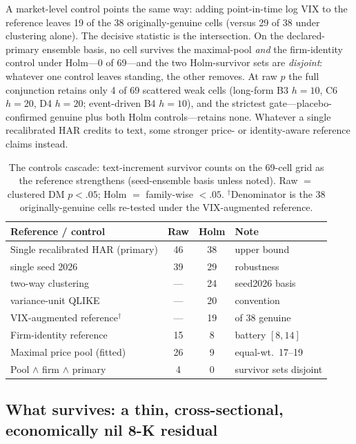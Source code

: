 A market-level control points the same way: adding point-in-time log VIX to the reference leaves 19 of the 38 originally-genuine cells (versus 29 of 38 under clustering alone). The decisive statistic is the intersection. On the declared-primary ensemble basis, no cell survives the maximal-pool \emph{and} the firm-identity control under Holm---0 of 69---and the two Holm-survivor sets are \emph{disjoint}: whatever one control leaves standing, the other removes. At raw $p$ the full conjunction retains only 4 of 69 scattered weak cells (long-form B3 $h{=}10$, C6 $h{=}20$, D4 $h{=}20$; event-driven B4 $h{=}10$), and the strictest gate---placebo-confirmed genuine plus both Holm controls---retains none. Whatever a single recalibrated HAR credits to text, some stronger price- or identity-aware reference claims instead.

\begin{table}[t]
\centering
\caption{The controls cascade: text-increment survivor counts on the 69-cell grid as the reference strengthens (seed-ensemble basis unless noted). Raw $=$ clustered DM $p<.05$; Holm $=$ family-wise $<.05$. $^{\dagger}$Denominator is the 38 originally-genuine cells re-tested under the VIX-augmented reference.}
\label{tab:cascade}
\footnotesize
\setlength{\tabcolsep}{4pt}
\begin{tabular}{@{}lccl@{}}
\toprule
Reference / control & Raw & Holm & Note \\
\midrule
Single recalibrated HAR (primary) & 46 & 38 & upper bound \\
\quad single seed 2026            & 39 & 29 & robustness \\
\quad two-way clustering          & --- & 24 & seed2026 basis \\
\quad variance-unit QLIKE         & --- & 20 & convention \\
VIX-augmented reference$^{\dagger}$ & --- & 19 & of 38 genuine \\
Firm-identity reference           & 15 & 8  & battery $[8,14]$ \\
Maximal price pool (fitted)       & 26 & 9  & equal-wt.\ 17--19 \\
Pool $\wedge$ firm $\wedge$ primary & 4 & 0 & survivor sets disjoint \\
\bottomrule
\end{tabular}
\end{table}

\subsection{What survives: a thin, cross-sectional, economically nil 8-K residual}
\label{sec:results-residual}

